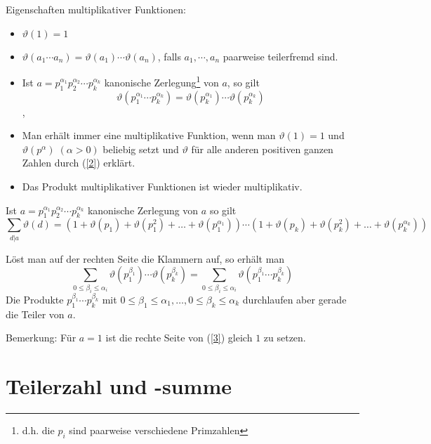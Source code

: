\documentclass[11pt]{article}
\begin{document}
\noindent Eigenschaften multiplikativer Funktionen:
\begin{itemize}
\item $\vartheta(1)=1$
\item $\vartheta(a_1\cdots a_n)=\vartheta(a_1)\cdots\vartheta(a_n)$,
falls $a_1,\cdots,a_n$ paarweise teilerfremd sind.
\item Ist $a=p_1^{\alpha_1} p_2^{\alpha_2}\cdots p_k^{\alpha_k}$ kanonische
Zerlegung\footnote{d.h. die $p_i$ sind paarweise verschiedene Primzahlen} von
$a$, so gilt
\begin{equation}\label{2}
\vartheta(p_1^{\alpha_1}\cdots p_k^{\alpha_k}) =\vartheta(p_k^{\alpha_1})
\cdots \vartheta(p_k^{\alpha_k})
\end{equation},
\item Man erh\"{a}lt immer eine multiplikative Funktion, wenn man $\vartheta
(1)=1$ und $\vartheta(p^\alpha) \;(\alpha>0)$ beliebig setzt und $\vartheta$
f\"{u}r alle anderen positiven ganzen Zahlen durch (\ref{2}) erkl\"{a}rt.
\item Das Produkt multiplikativer Funktionen ist wieder multiplikativ.
\end{itemize}
\begin{theorem} Ist $a=p_1^{\alpha_1} p_2^{\alpha_2}\cdots p_k^{\alpha_k}$
kanonische Zerlegung von $a$ so gilt
\begin{equation}\label{3}
\sum_{d|a}\vartheta(d)=(1+\vartheta(p_1)+\vartheta(p_1^2)+\ldots
+\vartheta(p_1^{\alpha_1}))\cdots (1+\vartheta(p_k)+\vartheta(p_k^2)+
\ldots+\vartheta(p_k^{\alpha_k})) 
\end{equation}
\end{theorem}
\begin{beweis}
  L\"{o}st man auf der rechten Seite die Klammern auf, so erh\"{a}lt man
  \[\sum_{0\leq\beta_i\leq\alpha_i}\vartheta(p_1^{\beta_1})\cdots\vartheta(p_k^{\beta_k})=\sum_{0\leq\beta_i\leq{\alpha_i}} 
  \vartheta(p_1^{\beta_1}\cdots p_k^{\beta_k})\] Die Produkte
  $p_1^{\beta_1}\cdots p_k^{\beta_k}$ mit
  $0\leq\beta_1\leq\alpha_1,\ldots,0\leq\beta_k\leq\alpha_k$
  durchlaufen aber gerade die Teiler von $a$.
\end{beweis}

\noindent Bemerkung: F\"{u}r $a=1$ ist die rechte Seite von (\ref{3}) gleich
$1$ zu setzen.

\section{Teilerzahl und -summe}
\end{document}
